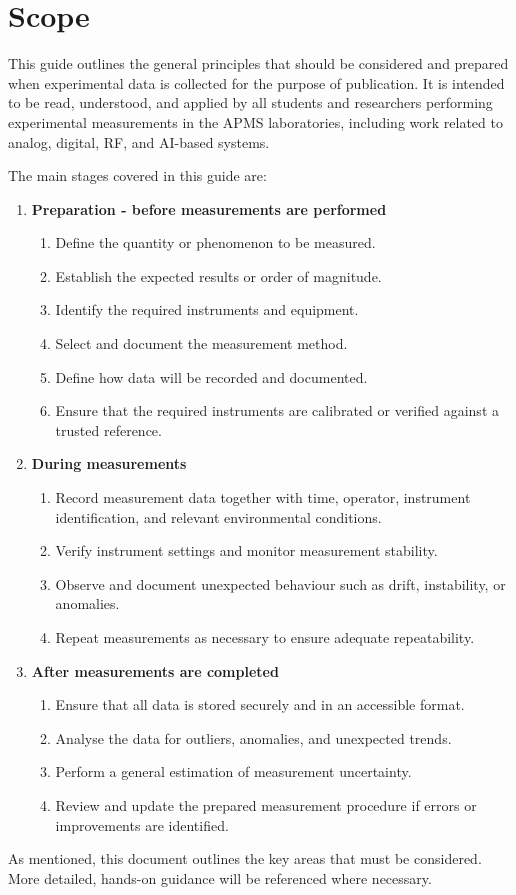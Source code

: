 \section{Scope}

This guide outlines the general principles that should be considered and prepared when experimental data is collected for the purpose of publication. It is intended to be read, understood, and applied by all students and researchers performing experimental measurements in the APMS laboratories, including work related to analog, digital, RF, and AI-based systems.

The main stages covered in this guide are:

\begin{enumerate}
\item \textbf{Preparation - before measurements are performed}
\begin{enumerate}
\item Define the quantity or phenomenon to be measured.
\item Establish the expected results or order of magnitude.
\item Identify the required instruments and equipment.
\item Select and document the measurement method.
\item Define how data will be recorded and documented.
\item Ensure that the required instruments are calibrated or verified against a trusted reference.
\end{enumerate}


\item \textbf{During measurements}
\begin{enumerate}
    \item Record measurement data together with time, operator, instrument identification, and relevant environmental conditions.
    \item Verify instrument settings and monitor measurement stability.
    \item Observe and document unexpected behaviour such as drift, instability, or anomalies.
    \item Repeat measurements as necessary to ensure adequate repeatability.
\end{enumerate}

\item \textbf{After measurements are completed}
\begin{enumerate}
    \item Ensure that all data is stored securely and in an accessible format.
    \item Analyse the data for outliers, anomalies, and unexpected trends.
    \item Perform a general estimation of measurement uncertainty.
    \item Review and update the prepared measurement procedure if errors or improvements are identified.
\end{enumerate}

\end{enumerate}

As mentioned, this document outlines the key areas that must be considered. More detailed, hands-on guidance will be referenced where necessary.
